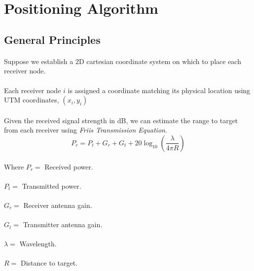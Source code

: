 \documentclass[10pt,letterpaper]{article}
\begin{document}
\section*{Positioning Algorithm}
\subsection*{General Principles}
\paragraph*{}Suppose we establish a 2D cartesian coordinate system on which to place each receiver node.
\paragraph*{}Each receiver node $i$ is assigned a coordinate matching its physical location using UTM coordinates, $(x_{i},y_{i})$
\paragraph*{}Given the received signal strength in dB, we can estimate the range to target from each receiver using \textit{Friis Transmission Equation}.
\begin{equation}
P_{r} = P_{t} + G_{r} + G_{t} + 20\log_{10}\left( \frac{\lambda}{4\pi R}\right)
\end{equation}
\paragraph*{} Where $P_{r} =$ Received power.
\paragraph*{} $P_{t} =$ Transmitted power.
\paragraph*{} $G_{r} =$ Receiver antenna gain.
\paragraph*{} $G_{t} =$ Transmitter antenna gain.
\paragraph*{} $\lambda =$ Wavelength.
\paragraph*{} $R =$ Distance to target.  
\end{document}
